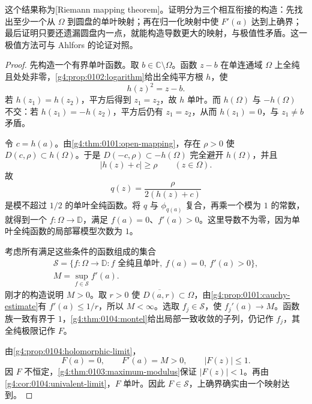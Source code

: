 这个结果称为[Riemann mapping theorem]。证明分为三个相互衔接的构造：先找出至少一个从 \(\Omega\) 到圆盘的单叶映射；再在归一化映射中使 \(F'(a)\) 达到上确界；最后证明只要还遗漏圆盘内一点，就能构造导数更大的映射，与极值性矛盾。这一极值方法可与 Ahlfors 的论证对照\cite[第6章第1.1节, 第230--231页]{Ahlfors1979Complex}。

\begin{proof}
	先构造一个有界单叶函数。取 \(b\in\mathbb C\setminus\Omega\)。函数 \(z-b\) 在单连通域 \(\Omega\) 上全纯且处处非零，\cref{g4:prop:0102:logarithm}给出全纯平方根 \(h\)，使
	\[
		h(z)^2=z-b.
	\]
	若 \(h(z_1)=h(z_2)\)，平方后得到 \(z_1=z_2\)，故 \(h\) 单叶。而 \(h(\Omega)\) 与 \(-h(\Omega)\) 不交：若 \(h(z_1)=-h(z_2)\)，平方后仍有 \(z_1=z_2\)，从而 \(h(z_1)=0\)，与 \(z_1\ne b\) 矛盾。

	令 \(c=h(a)\)。由\cref{g4:thm:0101:open-mapping}，存在 \(\rho>0\) 使 \(D(c,\rho)\subset h(\Omega)\)。于是 \(D(-c,\rho)\subset-h(\Omega)\) 完全避开 \(h(\Omega)\)，并且
	\[
		|h(z)+c|\ge\rho\qquad(z\in\Omega).
	\]
	故
	\[
		q(z)=\frac{\rho}{2(h(z)+c)}
	\]
	是模不超过 \(1/2\) 的单叶全纯函数。将 \(q\) 与 \(\phi_{q(a)}\) 复合，再乘一个模为 \(1\) 的常数，就得到一个 \(f:\Omega\to\mathbb D\)，满足 \(f(a)=0\)、\(f'(a)>0\)。这里导数不为零，因为单叶全纯函数的局部幂模型次数为 \(1\)。

	考虑所有满足这些条件的函数组成的集合
	\begin{gather*}
		\mathcal S=\{f:\Omega\to\mathbb D:
		f\text{ 全纯且单叶},\ f(a)=0,\ f'(a)>0\},\\
		M=\sup_{f\in\mathcal S}f'(a).
	\end{gather*}
	刚才的构造说明 \(M>0\)。取 \(r>0\) 使 \(\overline{D(a,r)}\subset\Omega\)，由\cref{g4:prop:0101:cauchy-estimate}有 \(f'(a)\le1/r\)，所以 \(M<\infty\)。选取 \(f_j\in\mathcal S\)，使 \(f_j'(a)\to M\)。函数族一致有界于 \(1\)，\cref{g4:thm:0104:montel}给出局部一致收敛的子列，仍记作 \(f_j\)，其全纯极限记作 \(F\)。

	由\cref{g4:prop:0104:holomorphic-limit}，
	\[
		F(a)=0,\qquad F'(a)=M>0,\qquad |F(z)|\le1.
	\]
	因 \(F\) 不恒定，\cref{g4:thm:0103:maximum-modulus}保证 \(|F(z)|<1\)。再由\cref{g4:cor:0104:univalent-limit}，\(F\) 单叶。因此 \(F\in\mathcal S\)，上确界确实由一个映射达到。


\end{proof}

